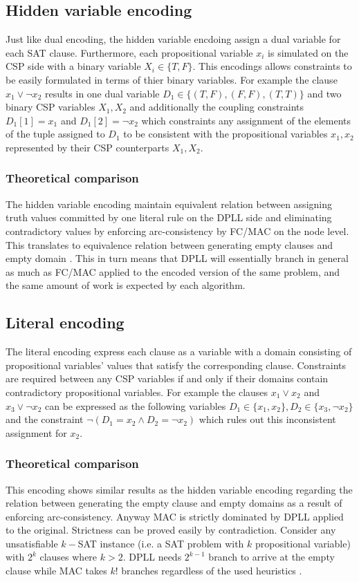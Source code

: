 \subsection{Hidden variable encoding}
Just like dual encoding, the hidden variable encdoing assign a dual variable for each SAT clause. Furthermore, each propositional variable $x_i$ is simulated on the CSP side with a binary variable $X_i \in \{T,F\}$. This encodings allows constraints to be easily formulated in terms of thier binary variables. For example the clause $x_1 \vee \neg x_2$ results in one dual variable $D_1 \in \{(T,F),(F,F),(T,T)\}$ and two binary CSP variables $X_1, X_2$ and additionally the coupling constraints $D_1[1] = x_1$ and $D_1[2] = \neg x_2$ which constraints any assignment of the elements of the tuple assigned to $D_1$ to be consistent with the propositional variables $x_1,x_2$ represented by their CSP counterparts $X_1,X_2$.

\subsubsection{Theoretical comparison}
The hidden variable encoding maintain equivalent relation between assigning truth values committed by one literal rule on the DPLL side and eliminating contradictory values by enforcing arc-consistency by FC/MAC on the node level. This translates to equivalence relation between generating empty clauses and empty domain \cite{walsh2000sat}. This in turn means that DPLL will essentially branch in general as much as FC/MAC applied to the encoded version of the same problem, and the same amount of work is expected by each algorithm.

\subsection{Literal encoding}
The literal encoding express each clause as a variable with a domain consisting of propositional variables' values that satisfy the corresponding clause. Constraints are required between any CSP variables if and only if their domains contain contradictory propositional variables. For example the clauses $x_1 \vee x_2$ and $x_3 \vee \neg x_2$ can be expressed as the following variables $D_1 \in \{x_1, x_2\}, D_2 \in \{x_3, \neg x_2\}$ and the constraint $\neg (D_1 = x_2 \wedge D_2 = \neg x_2)$ which rules out this inconsistent assignment for $x_2$.

\subsubsection{Theoretical comparison}
This encoding shows similar results as the hidden variable encoding regarding the relation between generating the empty clause and empty domains as a result of enforcing arc-consistency. Anyway MAC is strictly dominated by DPLL applied to the original. Strictness can be proved easily by contradiction. Consider any unsatisfiable $k-$SAT instance (i.e. a SAT problem with $k$ propositional variable) with $2^k$ clauses where $k > 2$. DPLL needs $2^{k-1}$ branch to arrive at the empty clause while MAC takes $k!$ branches regardless of the used heuristics \cite{walsh2000sat}.

